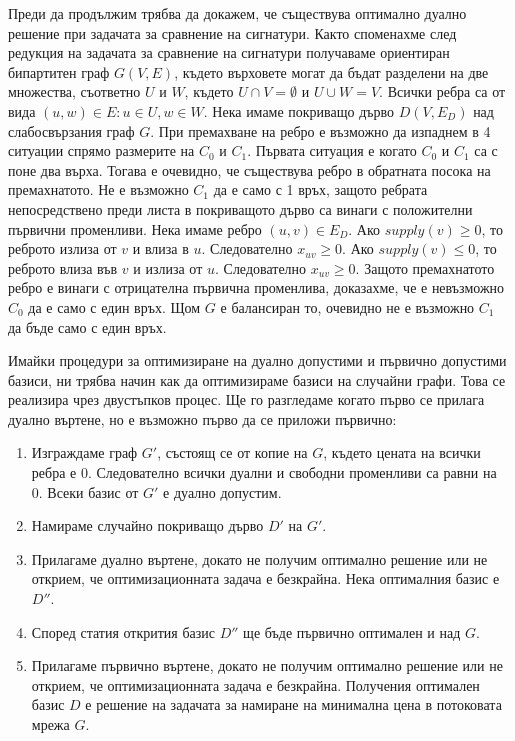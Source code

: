 \documentclass[a4paper,12pt]{article}
\begin{document}
\bigbreak

Преди да продължим трябва да докажем, че съществува оптимално дуално решение при задачата за сравнение на сигнатури. Както споменахме след редукция на задачата за сравнение на сигнатури получаваме ориентиран бипартитен граф $G(V, E)$, където върховете могат да бъдат разделени на две множества, съответно $U$ и $W$, където $U \cap V = \emptyset$ и $U \cup W = V$. Всички ребра са от вида $(u, w) \in E: u \in U, w \in W$. Нека имаме покриващо дърво $D(V, E_D)$ над слабосвързания граф $G$. При премахване на ребро е възможно да изпаднем в 4 ситуации спрямо размерите на $C_0$ и $C_1$. Първата ситуация е когато $C_0$ и $C_1$ са с поне два върха. Тогава е очевидно, че съществува ребро в обратната посока на премахнатото. Не е възможно $C_1$ да е само с 1 връх, защото ребрата непосредствено преди листа в покриващото дърво са винаги с положителни първични променливи. Нека имаме ребро $(u, v) \in E_D$. Ако $supply(v) \geq 0$, то реброто излиза от $v$ и влиза в $u$. Следователно $x_{uv} \geq 0$. Ако $supply(v) \leq 0$, то реброто влиза във $v$ и излиза от $u$. Следователно $x_{uv} \geq 0$. Защото премахнатото ребро е винаги с отрицателна първична променлива, доказахме, че е невъзможно $C_0$ да е само с един връх. Щом $G$ е балансиран то, очевидно не е възможно $C_1$ да бъде само с един връх.

\bigbreak

Имайки процедури за оптимизиране на дуално допустими и първично допустими базиси, ни трябва начин как да оптимизираме базиси на случайни графи. Това се реализира чрез двустъпков процес. Ще го разгледаме когато първо се прилага дуално въртене, но е възможно първо да се приложи първично:

\begin{enumerate}
    \item Изграждаме граф $G'$, състоящ се от копие на $G$, където цената на всички ребра е 0. Следователно всички дуални и свободни променливи са равни на 0. Всеки базис от $G'$ е дуално допустим.
    \item Намираме случайно покриващо дърво $D'$ на $G'$.
    \item Прилагаме дуално въртене, докато не получим оптимално решение или не открием, че оптимизационната задача е безкрайна. Нека оптималния базис е $D''$.
    \item Според статия \cite{networksimplexmethod} открития базис $D''$ ще бъде първично оптимален и над $G$.
    \item Прилагаме първично въртене, докато не получим оптимално решение или не открием, че оптимизационната задача е безкрайна. Получения оптимален базис $D$ е решение на задачата за намиране на минимална цена в потоковата мрежа $G$.
\end{enumerate}
\end{document}
